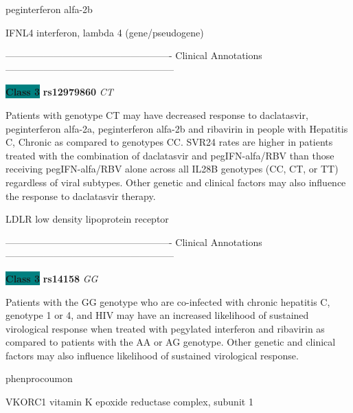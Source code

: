 \documentclass{resume} %
\begin{document}
\begin{rSection}{ peginterferon alfa-2b }
\begin{rSubsection}{ IFNL4 }{ interferon, lambda 4 (gene/pseudogene) }{}{}
\item[] ---------------------------------------------------- Clinical Annotations -----------------------------------------------------\newline
\item \textbf{\colorbox{teal} {Class 3}} \textbf{ rs12979860 } \textit{ CT }
\item[] Patients with genotype CT may have decreased response to daclatasvir, peginterferon alfa-2a, peginterferon alfa-2b and ribavirin in people with Hepatitis C, Chronic as compared to genotypes CC. SVR24 rates are higher in patients treated with the combination of daclatasvir and pegIFN-alfa/RBV than those receiving pegIFN-alfa/RBV alone across all IL28B genotypes (CC, CT, or TT) regardless of viral subtypes. Other genetic and clinical factors may also influence the response to daclatasvir therapy.
\end{rSubsection}\begin{rSubsection}{ LDLR }{ low density lipoprotein receptor }{}{}
\item[]

\item[] ---------------------------------------------------- Clinical Annotations -----------------------------------------------------\newline
\item \textbf{\colorbox{teal} {Class 3}} \textbf{ rs14158 } \textit{ GG }
\item[] Patients with the GG genotype who are co-infected with chronic hepatitis C, genotype 1 or 4, and HIV may have an increased likelihood of sustained virological response when treated with pegylated interferon and ribavirin as compared to patients with the AA or AG genotype. Other genetic and clinical factors may also influence likelihood of sustained virological response. 
\end{rSubsection}

\end{rSection}\begin{rSection}{ phenprocoumon }
\item[]

\begin{rSubsection}{ VKORC1 }{ vitamin K epoxide reductase complex, subunit 1 }{}{}
\item[]


\end{rSubsection}
\end{rSection}
\end{document}
